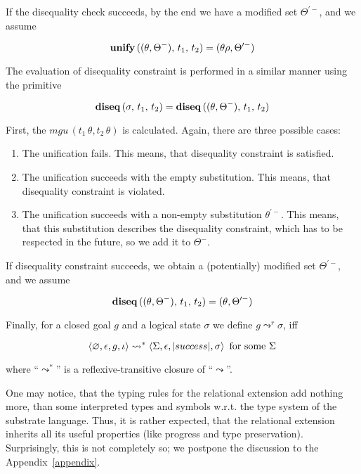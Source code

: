 If the disequality check succeeds, by the end we have a modified set $\Theta^{\prime-}$, and we assume

$$
{\bf unify}\,((\theta,\Theta^-),\,t_1,\,t_2)=(\theta\rho,\Theta^{\prime-})
$$

The evaluation of disequality constraint is performed in a similar manner using the primitive

$$
{\bf diseq}\,(\sigma,\,t_1,\,t_2)={\bf diseq}\,((\theta,\Theta^-),\,t_1,\,t_2)
$$

First, the $mgu\,(t_1\,\theta,t_2\,\theta)$ is calculated. Again, there are three
possible cases:

\begin{enumerate}
\item The unification fails. This means, that disequality constraint is satisfied.
\item The unification succeeds with the empty substitution. This means, that disequality
constraint is violated.
\item The unification succeeds with a non-empty substitution $\theta^{\prime-}$. This means, that 
this substitution describes the disequality constraint, which has to be respected in
the future, so we add it to $\Theta^-$. 
\end{enumerate}

If disequality constraint succeeds, we obtain a (potentially) modified set $\Theta^{\prime-}$, and we
assume

$$
{\bf diseq}\,((\theta,\Theta^-),\,t_1,\,t_2)=(\theta,\Theta^{\prime-})
$$

Finally, for a closed goal $g$ and a logical state $\sigma$ we define $g \leadsto^r \sigma$, iff

$$
\inbr{\emptyset,\epsilon,g,\iota}\leadsto^*\inbr{\Sigma,\epsilon,\lstinline|success|,\sigma}\mbox{ for some $\Sigma$}
$$
 
\noindent where ``$\leadsto^*$'' is a reflexive-transitive closure of ``$\leadsto$''. 

One may notice, that the typing rules for the relational extension add nothing more, than some
interpreted types and symbols w.r.t. the type system of the substrate language. Thus, it 
is rather expected, that the relational extension inherits all its useful properties (like progress and
type preservation). Surprisingly, this is not completely so; we postpone the discussion to the 
Appendix~\ref{appendix}.  



